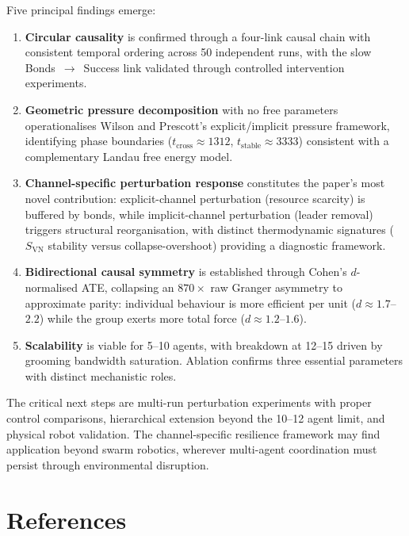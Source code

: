 \documentclass[12pt]{article}
\begin{document}
Five principal findings emerge:
\begin{enumerate}
\item \textbf{Circular causality} is confirmed through a four-link causal chain with consistent temporal ordering across 50 independent runs, with the slow Bonds~$\to$~Success link validated through controlled intervention experiments.

\item \textbf{Geometric pressure decomposition} with no free parameters operationalises Wilson and Prescott's explicit/implicit pressure framework, identifying phase boundaries ($t_\mathrm{cross} \approx 1312$, $t_\mathrm{stable} \approx 3333$) consistent with a complementary Landau free energy model.

\item \textbf{Channel-specific perturbation response} constitutes the paper's most novel contribution: explicit-channel perturbation (resource scarcity) is buffered by bonds, while implicit-channel perturbation (leader removal) triggers structural reorganisation, with distinct thermodynamic signatures ($S_\mathrm{VN}$ stability versus collapse-overshoot) providing a diagnostic framework.

\item \textbf{Bidirectional causal symmetry} is established through Cohen's $d$-normalised ATE, collapsing an $870\times$ raw Granger asymmetry to approximate parity: individual behaviour is more efficient per unit ($d \approx 1.7$--$2.2$) while the group exerts more total force ($d \approx 1.2$--$1.6$).

\item \textbf{Scalability} is viable for 5--10 agents, with breakdown at 12--15 driven by grooming bandwidth saturation. Ablation confirms three essential parameters with distinct mechanistic roles.
\end{enumerate}

The critical next steps are multi-run perturbation experiments with proper control comparisons, hierarchical extension beyond the 10--12 agent limit, and physical robot validation. The channel-specific resilience framework may find application beyond swarm robotics, wherever multi-agent coordination must persist through environmental disruption.



\section*{References}
\end{document}
